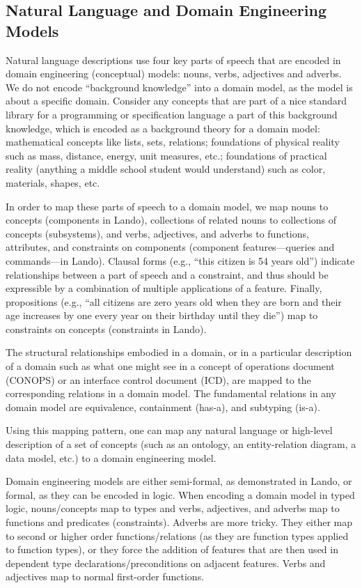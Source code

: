 \documentclass[10pt,letterpaper]{article}
\begin{document}
\subsection{Natural Language and Domain Engineering Models}
\label{natural-language-and-domain-engineering-models}

Natural language descriptions use four key parts of speech that are encoded in domain engineering (conceptual) models: nouns, verbs, adjectives and adverbs. We do not encode ``background knowledge'' into a domain model, as the model is about a specific domain. Consider any concepts that are part of a nice standard library for a programming or specification language a part of this background knowledge, which is encoded as a background theory for a domain model: mathematical concepts like lists, sets, relations; foundations of physical reality such as mass, distance, energy, unit measures, etc.; foundations of practical reality (anything a middle school student would understand) such as color, materials, shapes, etc.

In order to map these parts of speech to a domain model, we map nouns to concepts (components in Lando), collections of related nouns to collections of concepts (subsystems), and verbs, adjectives, and adverbs to functions, attributes, and constraints on components (component features---queries and commands---in Lando). Clausal forms (e.g., ``this citizen is 54 years old'') indicate relationships between a part of speech and a constraint, and thus should be expressible by a combination of multiple applications of a feature. Finally, propositions (e.g., ``all citizens are zero years old when they are born and their age increases by one every year on their birthday until they die'') map to constraints on concepts (constraints in Lando).

The structural relationships embodied in a domain, or in a particular description of a domain such as what one might see in a concept of operations document (CONOPS) or an interface control document (ICD), are mapped to the corresponding relations in a domain model. The fundamental relations in any domain model are equivalence, containment (has-a), and subtyping (is-a).

Using this mapping pattern, one can map any natural language or high-level description of a set of concepts (such as an ontology, an entity-relation diagram, a data model, etc.) to a domain engineering model.

Domain engineering models are either semi-formal, as demonstrated in Lando, or formal, as they can be encoded in logic. When encoding a domain model in typed logic, nouns/concepts map to types and verbs, adjectives, and adverbs map to functions and predicates (constraints). Adverbs are more tricky.  They either map to second or higher order functions/relations (as they are function types applied to function types), or they force the addition of features that are then used in dependent type declarations/preconditions on adjacent features.  Verbs and adjectives map to normal first-order functions.
\end{document}
